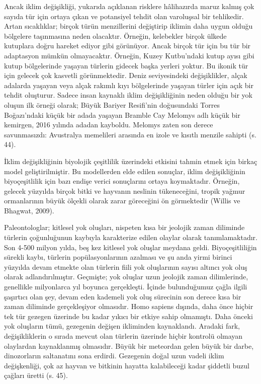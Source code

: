 \documentclass[
]{book}
\begin{document}
Ancak iklim değişikliği, yukarıda açıklanan risklere hâlihazırda maruz kalmış çok sayıda tür için ortaya çıkan ve potansiyel tehdit olan varoluşsal bir tehlikedir. Artan sıcaklıklar; birçok türün menzillerini değiştirip iklimin daha uygun olduğu bölgelere taşınmasına neden olacaktır. Örneğin, kelebekler birçok ülkede kutuplara doğru hareket ediyor gibi görünüyor. Ancak birçok tür için bu tür bir adaptasyon mümkün olmayacaktır. Örneğin, Kuzey Kutbu'ndaki kutup ayısı gibi kutup bölgelerinde yaşayan türlerin gidecek başka yerleri yoktur. Bu ikonik tür için gelecek çok kasvetli görünmektedir. Deniz seviyesindeki değişiklikler, alçak adalarda yaşayan veya alçak rakımlı kıyı bölgelerinde yaşayan türler için açık bir tehdit oluşturur. Sadece insan kaynaklı iklim değişikliğinin neden olduğu bir yok oluşun ilk örneği olarak; Büyük Bariyer Resifi'nin doğusundaki Torres Boğazı'ndaki küçük bir adada yaşayan Bramble Cay Melomys adlı küçük bir kemirgen, 2016 yılında adadan kayboldu. Melomys zaten son derece savunmasızdı: Avustralya memelileri arasında en izole ve kısıtlı menzile sahipti (s. 44). \citep{bush2020}

İklim değişikliğinin biyolojik çeşitlilik üzerindeki etkisini tahmin etmek için birkaç model geliştirilmiştir. Bu modellerden elde edilen sonuçlar, iklim değişikliğinin biyoçeşitlilik için bazı endişe verici sonuçlarını ortaya koymaktadır. Örneğin, gelecek yüzyılda birçok bitki ve hayvanın neslinin tükeneceğini, tropik yağmur ormanlarının büyük ölçekli olarak zarar göreceğini ön görmektedir (Willis ve Bhagwat, 2009). \citep{willis2009biodiversity}

Paleontologlar; kitlesel yok oluşları, nispeten kısa bir jeolojik zaman diliminde türlerin çoğunluğunun kaybıyla karakterize edilen olaylar olarak tanımlamaktadır. Son 4-500 milyon yılda, beş kez kitlesel yok oluşlar meydana geldi. Biyoçeşitliliğin sürekli kaybı, türlerin popülasyonlarının azalması ve şu anda yirmi birinci yüzyılda devam etmekte olan türlerin fiili yok oluşlarının sayısı altıncı yok oluş olarak adlandırılmıştır. Geçmişte; yok oluşlar uzun jeolojik zaman dilimlerinde, genellikle milyonlarca yıl boyunca gerçekleşti. İçinde bulunduğumuz çağla ilgili şaşırtıcı olan şey, devam eden kademeli yok oluş sürecinin son derece kısa bir zaman diliminde gerçekleşiyor olmasıdır. Homo sapiens dışında, daha önce hiçbir tek tür gezegen üzerinde bu kadar yıkıcı bir etkiye sahip olmamıştı. Daha önceki yok oluşların tümü, gezegenin değişen ikliminden kaynaklandı. Aradaki fark, değişikliklerin o sırada mevcut olan türlerin üzerinde hiçbir kontrolü olmayan olaylardan kaynaklanmış olmasıdır. Büyük bir meteordan gelen büyük bir darbe, dinozorların saltanatını sona erdirdi. Gezegenin doğal uzun vadeli iklim değişkenliği, çok az hayvan ve bitkinin hayatta kalabileceği kadar şiddetli buzul çağları üretti (s. 45). \citep{bush2020}
\end{document}
